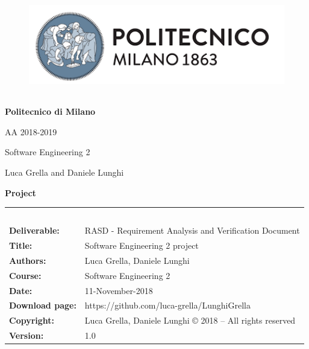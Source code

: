 \documentclass [12pt]{article}
\begin{document}
\begin{figure}[ht!]
\centering
\includegraphics[height=4.41cm,width=14.25cm]{Images/polimilogo.png}
\end{figure}
\begin{large}
\centerline{\textbf{Politecnico di Milano} }
\centerline{AA 2018-2019}
\vspace{0.5cm}
\centerline{Software Engineering 2}
\centerline{Luca Grella and Daniele Lunghi}
\centerline{\textbf{Project}}

\end{large}
 


\begin{table}[h!]
\begin{tabu} to \textwidth { X[0.3,r,p] X[0.7,l,p] }
	

\\
\\
\\
\\
\\	
	
\hline
\\

\textbf{Deliverable:} & RASD - Requirement Analysis and Verification Document \\
\textbf{Title:} &Software Engineering 2 project \\
\textbf{Authors:} & Luca Grella, Daniele Lunghi \\
\textbf{Course:} & Software Engineering 2 \\
\textbf{Date:} & 11-November-2018 \\
\textbf{Download page:} & https://github.com/luca-grella/LunghiGrella \\
\textbf{Copyright:} & Luca Grella, Daniele Lunghi © 2018 – All rights reserved \\
\textbf{Version:} & 1.0

\\
\hline


\end{tabu}
\end{table}
\end{document}
